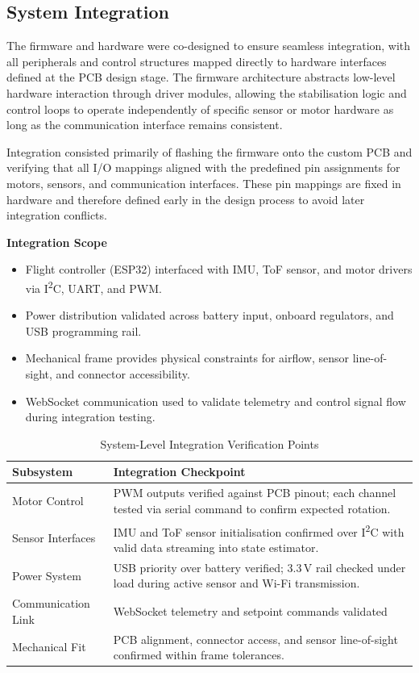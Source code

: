\subsection{System Integration}

The firmware and hardware were co-designed to ensure seamless integration, with all peripherals and control structures mapped directly to hardware interfaces defined at the PCB design stage. The firmware architecture abstracts low-level hardware interaction through driver modules, allowing the stabilisation logic and control loops to operate independently of specific sensor or motor hardware as long as the communication interface remains consistent.

Integration consisted primarily of flashing the firmware onto the custom PCB and verifying that all I/O mappings aligned with the predefined pin assignments for motors, sensors, and communication interfaces. These pin mappings are fixed in hardware and therefore defined early in the design process to avoid later integration conflicts.

\textbf{Integration Scope}
\begin{itemize}
    \item Flight controller (ESP32) interfaced with IMU, ToF sensor, and motor drivers via I\textsuperscript{2}C, UART, and PWM.
    \item Power distribution validated across battery input, onboard regulators, and USB programming rail.
    \item Mechanical frame provides physical constraints for airflow, sensor line-of-sight, and connector accessibility.
    \item WebSocket communication used to validate telemetry and control signal flow during integration testing.
\end{itemize}

\begin{table}[H]
\centering
\renewcommand{\arraystretch}{1.2}
\begin{tabular}{|p{4cm}|p{9cm}|}
\hline
\rowcolor{gray!15}
\textbf{Subsystem} & \textbf{Integration Checkpoint} \\
\hline
Motor Control & PWM outputs verified against PCB pinout; each channel tested via serial command to confirm expected rotation. \\
\hline
Sensor Interfaces & IMU and ToF sensor initialisation confirmed over I\textsuperscript{2}C with valid data streaming into state estimator. \\
\hline
Power System & USB priority over battery verified; 3.3\,V rail checked under load during active sensor and Wi-Fi transmission. \\
\hline
Communication Link & WebSocket telemetry and setpoint commands validated \\
\hline
Mechanical Fit & PCB alignment, connector access, and sensor line-of-sight confirmed within frame tolerances. \\
\hline
\end{tabular}
\caption{System-Level Integration Verification Points}
\label{tab:system-integration}
\end{table}


